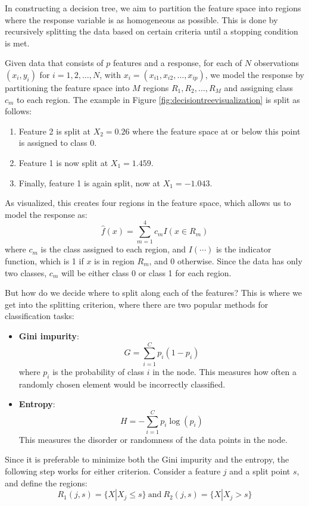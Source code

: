 \documentclass[english,11pt,a4paper,titlepage]{article}
\begin{document}
	In constructing a decision tree, we aim to partition the feature space into regions where the response variable is as homogeneous as possible. This is done by recursively splitting the data based on certain criteria until a stopping condition is met.
	
	Given data that consists of \( p \) features and a response, for each of \( N \) observations \((x_i, y_i)\) for \( i = 1, 2, \ldots, N \), with \( x_i = (x_{i1}, x_{i2}, \ldots, x_{ip}) \), we model the response by partitioning the feature space into \( M \) regions \( R_1, R_2, \ldots, R_M \) and assigning class \( c_m \) to each region. The example in Figure \ref{fig:decisiontreevisualization} is split as follows:	
	\begin{enumerate}
		\item Feature 2 is split at \(X_2 = 0.26\) where the feature space at or below this point is assigned to class 0.
		\item Feature 1 is now split at \(X_1 = 1.459\).
		\item Finally, feature 1 is again split, now at \(X_1 = -1.043\).
	\end{enumerate}
	
	As visualized, this creates four regions in the feature space, which allows us to model the response as:
	\begin{equation}
		\hat{f}(x) = \sum_{m=1}^{4} c_m I(x \in R_m)
	\end{equation}
	where \( c_m \) is the class assigned to each region, and \( I(\cdots) \) is the indicator function, which is 1 if \( x \) is in region \( R_m \), and 0 otherwise. Since the data has only two classes, \( c_m \) will be either class 0 or class 1 for each region.
	
	But how do we decide where to split along each of the features? This is where we get into the splitting criterion, where there are two popular methods for classification tasks:
	
	\begin{itemize}
		\item \textbf{Gini impurity}:
		\begin{equation}
			G = \sum_{i=1}^{C}p_i(1-p_i)
		\end{equation}
		where $p_i$ is the probability of class $i$ in the node. This measures how often a randomly chosen element would be incorrectly classified.
		\item \textbf{Entropy}:
		\begin{equation}
			H = -\sum_{i=1}^{C}p_i\log(p_i)
		\end{equation}
		This measures the disorder or randomness of the data points in the node.
	\end{itemize}
	Since it is preferable to minimize both the Gini impurity and the entropy, the following step works for either criterion. Consider a feature \( j \) and a split point \( s \), and define the regions:
	\begin{equation}
		R_1(j, s) = \{X|X_j \leq s\}\ \text{and}\ R_2(j, s) = \{X|X_j > s\}
	\end{equation}
	
\end{document}
